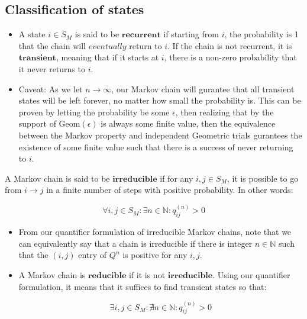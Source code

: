 \subsection{Classification of states}

\begin{itemize}
\item A state $i \in S_M$ is said to be $\textbf{recurrent}$ if starting from $i$, the probability is 1 that the chain will $\textit{eventually}$ return to $i$. If the chain is not recurrent, it is $\textbf{transient}$, meaning that if it starts at $i$, there is a non-zero probability that it never returns to $i$.

\item Caveat: As we let $n \to \infty$, our Markov chain will gurantee that all transient states will be left forever, no matter how small the probability is. This can be proven by letting the probability be some $\epsilon$, then realizing that by the support of $\text{Geom}(\epsilon)$ is always some finite value, then the equivalence between the Markov property and independent Geometric trials gurantees the existence of some finite value such that there is a success of never returning to $i$.
\end{itemize}

\begin{definition}[Reducibility] A Markov chain is said to be $\textbf{irreducible}$ if for any $i,j \in S_M$, it is possible to go from $i \to j$ in a finite number of steps with positive probability. In other words:
\end{definition}

$$\forall i,j \in S_M: \exists n \in \mathbb{N} : q_{ij}^{(n)} > 0$$
\begin{itemize}
\item From our quantifier formulation of irreducible Markov chains, note that we can equivalently say that a chain is irreducible if there is integer $n \in \mathbb{N}$ such that the $(i,j)$ entry of $Q^n$ is positive for any $i,j$.

\item A Markov chain is $\textbf{reducible}$ if it is not $\textbf{irreducible}$. Using our quantifier formulation, it means that it suffices to find transient states so that:

$$\exists i,j \in S_M: \nexists n \in \mathbb{N} : q_{ij}^{(n)} > 0$$
\end{itemize}
